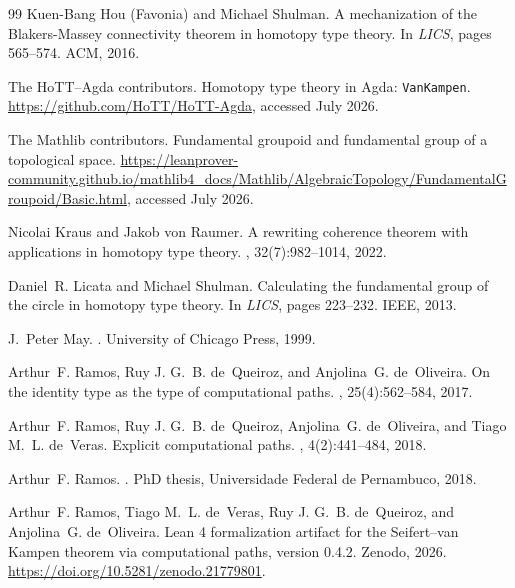 \documentclass{lmcs}
\theoremstyle{definition}
\theoremstyle{plain}
\theoremstyle{remark}
\begin{document}
\begin{thebibliography}{99}
Kuen-Bang {Hou (Favonia)} and Michael Shulman.
\newblock A mechanization of the {Blakers-Massey} connectivity theorem in homotopy type theory.
\newblock In {\em LICS}, pages 565--574. ACM, 2016.

The HoTT--Agda contributors.
\newblock Homotopy type theory in {Agda}: \texttt{VanKampen}.
\newblock \url{https://github.com/HoTT/HoTT-Agda}, accessed July 2026.

The Mathlib contributors.
\newblock Fundamental groupoid and fundamental group of a topological space.
\newblock \url{https://leanprover-community.github.io/mathlib4_docs/Mathlib/AlgebraicTopology/FundamentalGroupoid/Basic.html},
accessed July 2026.

Nicolai Kraus and Jakob von Raumer.
\newblock A rewriting coherence theorem with applications in homotopy type theory.
, 32(7):982--1014, 2022.

Daniel~R. Licata and Michael Shulman.
\newblock Calculating the fundamental group of the circle in homotopy type theory.
\newblock In {\em LICS}, pages 223--232. IEEE, 2013.

J.~Peter May.
.
\newblock University of Chicago Press, 1999.

Arthur~F. Ramos, Ruy J. G.~B. de~Queiroz, and Anjolina~G. de~Oliveira.
\newblock On the identity type as the type of computational paths.
, 25(4):562--584, 2017.

Arthur~F. Ramos, Ruy J. G.~B. de~Queiroz, Anjolina~G. de~Oliveira, and Tiago M.~L. de~Veras.
\newblock Explicit computational paths.
, 4(2):441--484, 2018.

Arthur~F. Ramos.
.
\newblock PhD thesis, Universidade Federal de Pernambuco, 2018.

Arthur~F. Ramos, Tiago M.~L. de~Veras, Ruy J. G.~B. de~Queiroz, and Anjolina~G. de~Oliveira.
\newblock Lean 4 formalization artifact for the Seifert--van Kampen theorem via computational paths, version 0.4.2.
\newblock Zenodo, 2026. \url{https://doi.org/10.5281/zenodo.21779801}.


\end{thebibliography}
\end{document}
